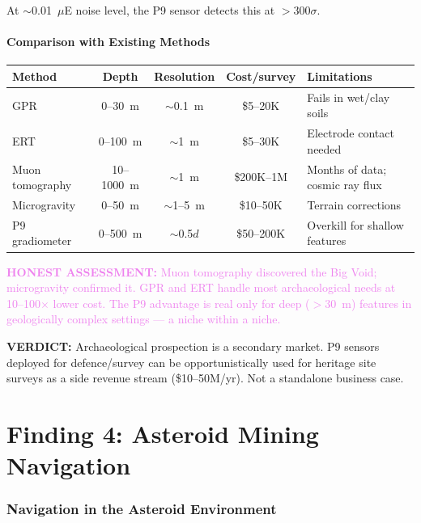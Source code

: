 \documentclass[11pt]{article}
\theoremstyle{definition}
\theoremstyle{remark}
\newcommand{\honest}[1]{\textcolor{violet}{\textbf{HONEST ASSESSMENT:} #1}}
\newcommand{\verdict}[1]{\textcolor{green!50!black}{\textbf{VERDICT:} #1}}
\begin{document}
At $\sim$0.01~$\mu$E noise level, the P9 sensor detects this at $>300\sigma$.

\subsection{Comparison with Existing Methods}

\begin{center}
\begin{tabular}{lcccl}
\toprule
\textbf{Method} & \textbf{Depth} & \textbf{Resolution} & \textbf{Cost/survey} & \textbf{Limitations} \\
\midrule
GPR & 0--30~m & $\sim$0.1~m & \$5--20K & Fails in wet/clay soils \\
ERT & 0--100~m & $\sim$1~m & \$5--30K & Electrode contact needed \\
Muon tomography & 10--1000~m & $\sim$1~m & \$200K--1M & Months of data; cosmic ray flux \\
Microgravity & 0--50~m & $\sim$1--5~m & \$10--50K & Terrain corrections \\
P9 gradiometer & 0--500~m & $\sim$0.5$d$ & \$50--200K & Overkill for shallow features \\
\bottomrule
\end{tabular}
\end{center}

\honest{Muon tomography discovered the Big Void; microgravity confirmed
it. GPR and ERT handle most archaeological needs at 10--100$\times$ lower
cost. The P9 advantage is real only for deep ($>30$~m) features in
geologically complex settings --- a niche within a niche.}

\verdict{Archaeological prospection is a secondary market. P9 sensors
deployed for defence/survey can be opportunistically used for
heritage site surveys as a side revenue stream (\$10--50M/yr).
Not a standalone business case.}

\part{Finding 4: Asteroid Mining Navigation}
\label{part:asteroid}

\section{Navigation in the Asteroid Environment}
\end{document}

